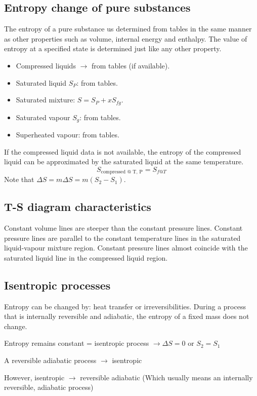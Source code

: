 \documentclass[class=report, crop=false, 12pt,a4paper]{standalone}
\begin{document}
\subsection{Entropy change of pure substances}
The entropy of a pure substance us determined from tables in the same manner as other properties such as volume, internal energy and enthalpy. The value of entropy at a specified state is determined just like any other property.
\begin{itemize}[noitemsep]
  \item Compressed liquids \(\rightarrow\) from tables (if available).
  \item Saturated liquid \(S_P\): from tables.
  \item Saturated mixture: \(S=S_P + xS_{fg}\).
  \item Saturated vapour \(S_g\): from tables.
  \item Superheated vapour: from tables.
\end{itemize}
If the compressed liquid data is not available, the entropy of the compressed liquid can be approximated by the saturated liquid at the same temperature.
\[ S_{\textrm{compressed @ T, P}} = S_{f@T} \]
Note that \( \Delta S = m \Delta S = m(S_2 - S_1)\).
\subsection{T-S diagram characteristics}
Constant volume lines are steeper than the constant pressure lines. Constant pressure lines are parallel to the constant temperature lines in the saturated liquid-vapour mixture region. Constant pressure lines almost coincide with the saturated liquid line in the compressed liquid region. 
\subsection{Isentropic processes}
Entropy can be changed by: heat transfer or irreversibilities. During a process that is internally reversible and adiabatic, the entropy of a fixed mass does not change.
\begin{center}
  Entropy remains constant = isentropic process \(\rightarrow \Delta S = 0 \textrm{ or } S_2 = S_1 \)
\end{center}
\begin{center}
  A reversible adiabatic process \(\rightarrow\) isentropic
\end{center}
\begin{center}
  However, isentropic \(\rightarrow\) reversible adiabatic (Which usually means an internally reversible, adiabatic process)
\end{center}
\end{document}

